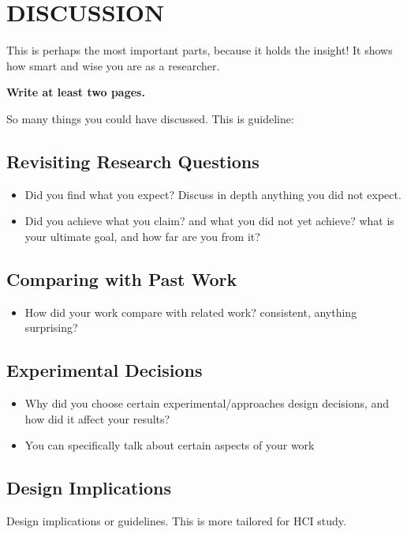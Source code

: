 \setlength{\footskip}{8mm}

\chapter{DISCUSSION}
This is perhaps the most important parts, because it holds the insight!  It shows how smart and wise you are as a researcher.

\textbf{Write at least two pages.}

So many things you could have discussed.  This is guideline:

\section{Revisiting Research Questions}
\begin{itemize}
    \item Did you find what you expect?  Discuss in depth anything you did not expect.
    \item Did you achieve what you claim?  and what you did not yet achieve? what is your ultimate goal, and how far are you from it? 
\end{itemize}
    
\section{Comparing with Past Work}
\begin{itemize}
    \item How did your work compare with related work? consistent, anything surprising? 
\end{itemize}
    
\section{Experimental Decisions}
\begin{itemize}
    \item Why did you choose certain experimental/approaches design decisions, and how did it affect your results?
    \item You can specifically talk about certain aspects of your work 
\end{itemize}
    
\section{Design Implications}
Design implications or guidelines.   This is more tailored for HCI study.

